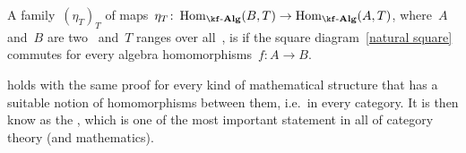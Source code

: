 \begin{definition}
  A family~$(\eta_T)_T$ of maps~$\eta_T \colon \Hom_{\cAlg{\kf}}(B,T) \to \Hom_{\cAlg{\kf}}(A,T)$, where~$A$ and~$B$ are two~{\algebras{$\kf$}} and~$T$ ranges over all~{\algebras{$\kf$}}, is  if the square diagram~\eqref{natural square} commutes for every algebra homomorphisms~$f \colon A \to B$.
\end{definition}


\begin{remark}
   holds with the same proof for every kind of mathematical structure that has a suitable notion of homomorphisms between them, i.e.\ in every category.
  It is then know as the , which is one of the most important statement in all of category theory (and mathematics).
\end{remark}











